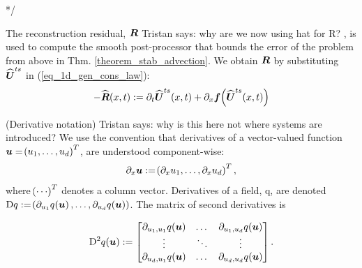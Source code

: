 \documentclass[final]{amsart}
\newcommand{\recgs}[1]{\widehat{\vec{#1}}}
\renewcommand{\vect}[1]{\geovec{#1}}
\renewcommand{\vec}[1]{\geovec{#1}}
\newcommand{\tristan}[1]{{\color{purple} Tristan says:  #1 }}
\numberwithin{equation}{section}
\begin{document}
*/
\begin{Rem}\label{Rem_reconstruction_residual_eq_adv}
  The reconstruction residual, $\vect{R}$ \tristan{why are we now
    using hat for R?}, is used to compute the smooth post-processor
  that bounds the error of the problem from above in
  Thm. \ref{theorem_stab_advection}.  We obtain $\vect{R}$ by
  substituting $\recgs{U}^{ts}$ in (\ref{eq_1d_gen_cons_law}):
	\begin{equation}\label{eq_reconstruction_gen_cons}
	-\recgs{R}\qp{ x,t}:=\partial_t\widehat{\vect U}^{ts}\qp{ {x},t}+\partial_x \vect{f}\qp{\recgs{U}^{ts}\qp{x,t}}
	\end{equation}
\end{Rem}


\begin{Rem}(Derivative notation)
  \tristan{why is this here not where systems are introduced?}
  We use the convention that derivatives of a vector-valued function $\vect{u}=\qp{u_1, \dots, u_d}^T$, are understood component-wise:
\begin{equation}
\partial_x \vect{u} := \qp{\partial_x u_1,\dots,\partial_x u_d}^T,
\end{equation}
where $\!\left({\cdots}\right)^T$ denotes a column vector.
Derivatives of a field, q, are denoted $\D q:=\qp{\partial_{u_1}q\qp{\vect{u}},\dots, \partial_{u_d}q\qp{\vect{u}}}$.  The matrix of second derivatives is 

\begin{equation}
	\D^2q\qp{\vec{u}}:=\begin{bmatrix}
\partial_{{u_1,}{u_1}}{q\qp{\vec{u}}}&\dotsc&\partial_{{u_1,}{u_d}}{q\qp{\vec{u}}}
\\
\vdots & \ddots &\vdots
\\
\partial_{{u_d,}{u_1}}{q\qp{\vec{u}}}&\dotsc&\partial_{{u_d,}{u_d}}{q\qp{\vec{u}}}
\end{bmatrix}.
\end{equation}
\end{Rem}
\end{document}
